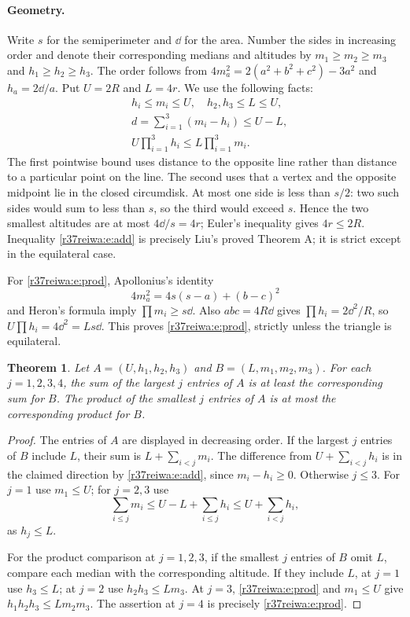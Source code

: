 \documentclass[11pt,a4paper]{article}
\numberwithin{equation}{section}
\newtheorem{theorem}{Theorem}[section]
\theoremstyle{definition}
\theoremstyle{remark}
\begin{document}
\paragraph{Geometry.}
Write $s$ for the semiperimeter and $\dd$ for the area. Number the sides in increasing order and denote their corresponding medians and altitudes by $m_1\ge m_2\ge m_3$ and $h_1\ge h_2\ge h_3$. The order follows from $4m_a^2=2(a^2+b^2+c^2)-3a^2$ and $h_a=2\dd/a$. Put $U=2R$ and $L=4r$. We use the following facts:
\begin{align}
&h_i\le m_i\le U,\quad h_2,h_3\le L\le U,\label{r37reiwa:e:basic}\\
&d=\sum_{i=1}^3(m_i-h_i)\le U-L,\label{r37reiwa:e:add}\\
&U\prod_{i=1}^3 h_i\le L\prod_{i=1}^3m_i.\label{r37reiwa:e:prod}
\end{align}
The first pointwise bound uses distance to the opposite line rather than distance to a particular point on the line. The second uses that a vertex and the opposite midpoint lie in the closed circumdisk. At most one side is less than $s/2$: two such sides would sum to less than $s$, so the third would exceed $s$. Hence the two smallest altitudes are at most $4\dd/s=4r$; Euler's inequality gives $4r\le 2R$. Inequality \eqref{r37reiwa:e:add} is precisely Liu's proved Theorem A; it is strict except in the equilateral case.

For \eqref{r37reiwa:e:prod}, Apollonius's identity
\[
 4m_a^2=4s(s-a)+(b-c)^2
\]
and Heron's formula imply $\prod m_i\ge s\dd$. Also $abc=4R\dd$ gives $\prod h_i=2\dd^2/R$, so $U\prod h_i=4\dd^2=L s\dd$. This proves \eqref{r37reiwa:e:prod}, strictly unless the triangle is equilateral.

\begin{theorem}\label{r37reiwa:vec}
Let $A=(U,h_1,h_2,h_3)$ and $B=(L,m_1,m_2,m_3)$. For each $j=1,2,3,4$, the sum of the largest $j$ entries of $A$ is at least the corresponding sum for $B$. The product of the smallest $j$ entries of $A$ is at most the corresponding product for $B$.
\end{theorem}
\begin{proof}
The entries of $A$ are displayed in decreasing order. If the largest $j$ entries of $B$ include $L$, their sum is $L+\sum_{i<j}m_i$. The difference from $U+\sum_{i<j}h_i$ is in the claimed direction by \eqref{r37reiwa:e:add}, since $m_i-h_i\ge0$. Otherwise $j\le3$. For $j=1$ use $m_1\le U$; for $j=2,3$ use
\[
 \sum_{i\le j}m_i\le U-L+\sum_{i\le j}h_i\le U+\sum_{i<j}h_i ,
\]
as $h_j\le L$.

For the product comparison at $j=1,2,3$, if the smallest $j$ entries of $B$ omit $L$, compare each median with the corresponding altitude. If they include $L$, at $j=1$ use $h_3\le L$; at $j=2$ use $h_2h_3\le Lm_3$. At $j=3$, \eqref{r37reiwa:e:prod} and $m_1\le U$ give $h_1h_2h_3\le Lm_2m_3$. The assertion at $j=4$ is precisely \eqref{r37reiwa:e:prod}.
\end{proof}
\end{document}
